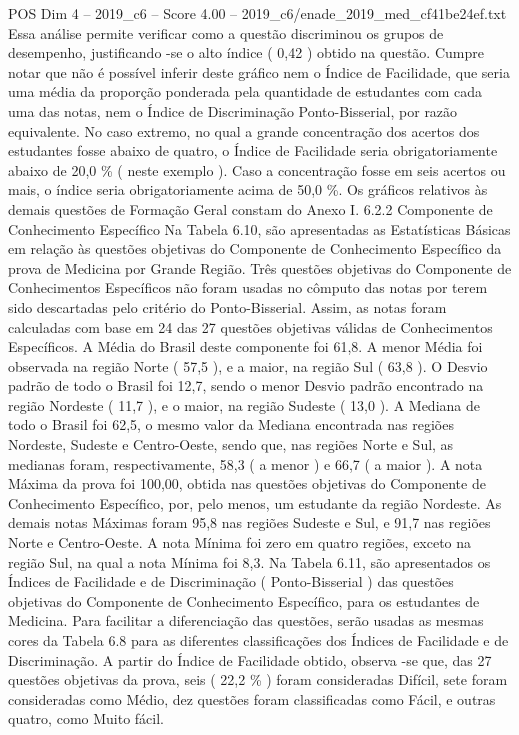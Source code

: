 \begin{textsample}{POS Dim 4 – 2019\_c6 – Score 4.00 – 2019\_c6/enade\_2019\_med\_cf41be24ef.txt}
Essa análise permite verificar como a questão discriminou os grupos de desempenho, justificando -se o alto índice ( 0,42 ) obtido na questão.
Cumpre notar que não é possível inferir deste gráfico nem o Índice de Facilidade, que seria uma média da proporção ponderada pela quantidade de estudantes com cada uma das notas, nem o Índice de Discriminação Ponto-Bisserial, por razão equivalente.
No caso extremo, no qual a grande concentração dos acertos dos estudantes fosse abaixo de quatro, o Índice de Facilidade seria obrigatoriamente abaixo de 20,0 \% ( neste exemplo ).
Caso a concentração fosse em seis acertos ou mais, o índice seria obrigatoriamente acima de 50,0 \%.
Os gráficos relativos às demais questões de Formação Geral constam do Anexo I. 6.2.2 Componente de Conhecimento Específico Na Tabela 6.10, são apresentadas as Estatísticas Básicas em relação às questões objetivas do Componente de Conhecimento Específico da prova de Medicina por Grande Região.
Três questões objetivas do Componente de Conhecimentos Específicos não foram usadas no cômputo das notas por terem sido descartadas pelo critério do Ponto-Bisserial.
Assim, as notas foram calculadas com base em 24 das 27 questões objetivas válidas de Conhecimentos Específicos.
A Média do Brasil deste componente foi 61,8.
A menor Média foi observada na região Norte ( 57,5 ), e a maior, na região Sul ( 63,8 ).
O Desvio padrão de todo o Brasil foi 12,7, sendo o menor Desvio padrão encontrado na região Nordeste ( 11,7 ), e o maior, na região Sudeste ( 13,0 ).
A Mediana de todo o Brasil foi 62,5, o mesmo valor da Mediana encontrada nas regiões Nordeste, Sudeste e Centro-Oeste, sendo que, nas regiões Norte e Sul, as medianas foram, respectivamente, 58,3 ( a menor ) e 66,7 ( a maior ).
A nota Máxima da prova foi 100,00, obtida nas questões objetivas do Componente de Conhecimento Específico, por, pelo menos, um estudante da região Nordeste.
As demais notas Máximas foram 95,8 nas regiões Sudeste e Sul, e 91,7 nas regiões Norte e Centro-Oeste.
A nota Mínima foi zero em quatro regiões, exceto na região Sul, na qual a nota Mínima foi 8,3.
Na Tabela 6.11, são apresentados os Índices de Facilidade e de Discriminação ( Ponto-Bisserial ) das questões objetivas do Componente de Conhecimento Específico, para os estudantes de Medicina.
Para facilitar a diferenciação das questões, serão usadas as mesmas cores da Tabela 6.8 para as diferentes classificações dos Índices de Facilidade e de Discriminação.
A partir do Índice de Facilidade obtido, observa -se que, das 27 questões objetivas da prova, seis ( 22,2 \% ) foram consideradas Difícil, sete foram consideradas como Médio, dez questões foram classificadas como Fácil, e outras quatro, como Muito fácil.

\end{textsample}
